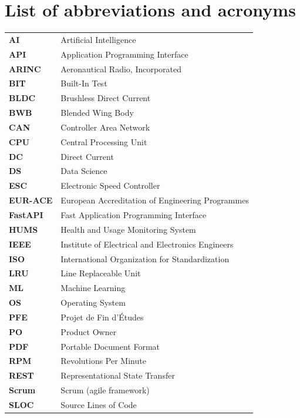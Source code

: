 \chapter*{List of abbreviations and acronyms}
\begin{longtable}{p{3cm}p{11cm}}
\textbf{AI} & Artificial Intelligence \\
\textbf{API} & Application Programming Interface \\
\textbf{ARINC} & Aeronautical Radio, Incorporated \\
\textbf{BIT} & Built-In Test \\
\textbf{BLDC} & Brushless Direct Current \\
\textbf{BWB} & Blended Wing Body \\
\textbf{CAN} & Controller Area Network \\
\textbf{CPU} & Central Processing Unit \\
\textbf{DC} & Direct Current \\
\textbf{DS} & Data Science \\
\textbf{ESC} & Electronic Speed Controller \\
\textbf{EUR-ACE} & European Accreditation of Engineering Programmes \\
\textbf{FastAPI} & Fast Application Programming Interface \\
\textbf{HUMS} & Health and Usage Monitoring System \\
\textbf{IEEE} & Institute of Electrical and Electronics Engineers \\
\textbf{ISO} & International Organization for Standardization \\
\textbf{LRU} & Line Replaceable Unit \\
\textbf{ML} & Machine Learning \\
\textbf{OS} & Operating System \\
\textbf{PFE} & Projet de Fin d'Études \\
\textbf{PO} & Product Owner \\
\textbf{PDF} & Portable Document Format \\
\textbf{RPM} & Revolutions Per Minute \\
\textbf{REST} & Representational State Transfer \\
\textbf{Scrum} & Scrum (agile framework) \\
\textbf{SLOC} & Source Lines of Code \\

\end{longtable}
